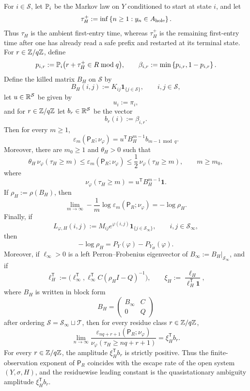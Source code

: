 \begin{theorem}
For \(i\in\mathcal S\), let \(\mathbb{P}_i\) be the Markov law on \(Y\)
conditioned to start at state \(i\), and let
\[
  \tau_H^+
  := \inf\left\{n\geq 1:y_n\in A_{\mathrm{hole}}\right\}.
\]
Thus \(\tau_H\) is the ambient first-entry time, whereas \(\tau_H^+\) is
the remaining first-entry time after one has already read a safe prefix
and restarted at its terminal state.
For \(r\in\mathbb{Z}/q\mathbb{Z}\), define
\[
  p_{i,r}:=\mathbb{P}_i\bigl(r+\tau_H^+\in R \bmod q\bigr),
  \qquad
  \beta_{i,r}:=\min\left\{p_{i,r},1-p_{i,r}\right\}.
\]
Define the killed matrix \(B_H\) on \(\mathcal S\) by
\[
  B_H(i,j):=K_{ij}\mathbf{1}_{\{j\in\mathcal S\}},
  \qquad i,j\in\mathcal S,
\]
let \(u\in\mathbb{R}^{\mathcal S}\) be given by
\[
  u_i:=\pi_i,
\]
and for \(r\in\mathbb{Z}/q\mathbb{Z}\) let \(b_r\in\mathbb{R}^{\mathcal S}\) be the vector
\[
  b_r(i):=\beta_{i,r}.
\]
Then for every \(m\geq 1\),
\[
  \varepsilon_m(\mathsf{P}_R;\nu_\varphi)
  = u^{\mathsf T}B_H^{m-1}b_{m-1\bmod q}.
\]
Moreover, there are \(m_0\geq1\) and \(\theta_H>0\) such that
\[
  \theta_H\,\nu_\varphi(\tau_H\geq m)
  \leq \varepsilon_m(\mathsf{P}_R;\nu_\varphi)
  \leq \frac12\,\nu_\varphi(\tau_H\geq m),
  \qquad m\geq m_0,
\]
where
\[
  \nu_\varphi(\tau_H\geq m)
  = u^{\mathsf T}B_H^{m-1}\mathbf{1}.
\]
If \(\rho_H:=\rho(B_H)\), then
\[
  \lim_{m\to\infty}
  -\frac1m\log\varepsilon_m(\mathsf{P}_R;\nu_\varphi)
  = -\log\rho_H.
\]
Finally, if
\[
  L_{\varphi,H}(i,j):=M_{ij}e^{\varphi(i,j)}\mathbf{1}_{\{j\in\mathcal S_\infty\}},
  \qquad i,j\in\mathcal S_\infty,
\]
then
\[
  -\log\rho_H
  = P_Y(\varphi)-P_{Y_H}(\varphi).
\]
Moreover, if \(\ell_\infty>0\) is a left Perron--Frobenius eigenvector
of \(B_\infty:=B_H|_{\mathcal S_\infty}\), and if
\[
  \ell_H^{\mathsf T}
  :=
  \bigl(
    \ell_\infty^{\mathsf T},
    \ell_\infty^{\mathsf T}C(\rho_H I-Q)^{-1}
  \bigr),
  \qquad
  \xi_H:=\frac{\ell_H}{\ell_H^{\mathsf T}\mathbf 1},
\]
where \(B_H\) is written in block form
\[
  B_H=
  \begin{pmatrix}
    B_\infty & C\\
    0 & Q
  \end{pmatrix}
\]
after ordering \(\mathcal S=\mathcal S_\infty\sqcup\mathcal T\), then
for every residue class \(r\in\mathbb{Z}/q\mathbb{Z}\),
\[
  \lim_{n\to\infty}
  \frac{\varepsilon_{nq+r+1}(\mathsf P_R;\nu_\varphi)}
       {\nu_\varphi(\tau_H\ge nq+r+1)}
  = \xi_H^{\mathsf T}b_r.
\]
For every \(r\in\mathbb{Z}/q\mathbb{Z}\), the amplitude
\(\xi_H^{\mathsf T}b_r\) is strictly positive.
Thus the finite-observation exponent of \(\mathsf{P}_R\) coincides with
the escape rate of the open system \((Y,\sigma,H)\), and the residuewise
leading constant is the quasistationary ambiguity amplitude
\(\xi_H^{\mathsf T}b_r\).
\end{theorem}

